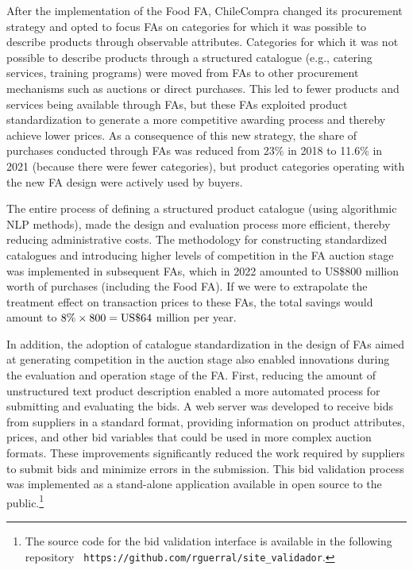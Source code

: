 After the implementation of the Food FA, ChileCompra changed its procurement strategy and opted to focus FAs on categories for which it was possible to describe products through observable attributes. Categories for which it was not possible to describe products through a structured catalogue (e.g., catering services, training programs) were moved from FAs to other procurement mechanisms such as auctions or direct purchases. {This led to fewer products and services being available through FAs, but these FAs exploited product standardization to generate a more competitive awarding process and thereby achieve lower prices. As a consequence of this new strategy, the share of purchases conducted through FAs was reduced from 23\% in 2018 to 11.6\% in 2021 (because there were fewer categories), but product categories operating with the new FA design were actively used by buyers.}

{} The entire process of defining a structured product catalogue (using algorithmic NLP methods), made the design and evaluation process more efficient, thereby reducing administrative costs. The methodology for constructing standardized catalogues and introducing higher levels of competition in the FA auction stage was implemented in subsequent FAs, which in 2022 amounted to US\$800 million worth of purchases (including the Food FA).  If we were to extrapolate the treatment effect on transaction prices to these FAs, the total savings would amount to $8\% \times 800 = \textup{US}\$64$  million per year.%

In addition, the adoption of catalogue standardization in the design of FAs aimed at generating competition in the auction stage also enabled innovations during the evaluation and operation stage of the FA. 
First, reducing the amount of unstructured text product description enabled a more automated process for submitting and evaluating the bids. A web server was developed to receive bids from suppliers in a standard format, providing information on product attributes, prices, and other bid variables that could be used in more complex auction formats. These improvements significantly reduced the work required by suppliers to submit bids and minimize errors in the submission. This bid validation process was implemented as a stand-alone application available in open source to the public.\footnote{The source code for the bid validation interface is available in the following repository \texttt{ https://github.com/rguerral/site\_validador}. }

